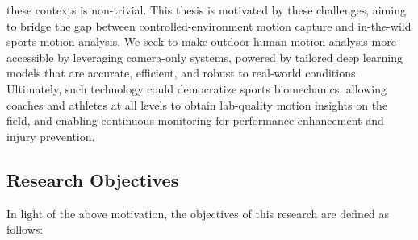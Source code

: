 these contexts is non-trivial. This thesis is motivated by these challenges, aiming to bridge the gap between controlled-environment motion capture and in-the-wild sports motion analysis. We seek to make outdoor human motion analysis more accessible by leveraging camera-only systems, powered by tailored deep learning models that are accurate, efficient, and robust to real-world conditions. Ultimately, such technology could democratize sports biomechanics, allowing coaches and athletes at all levels to obtain lab-quality motion insights on the field, and enabling continuous monitoring for performance enhancement and injury prevention. \subsection{Research Objectives}
In light of the above motivation, the objectives of this research are defined as follows:
